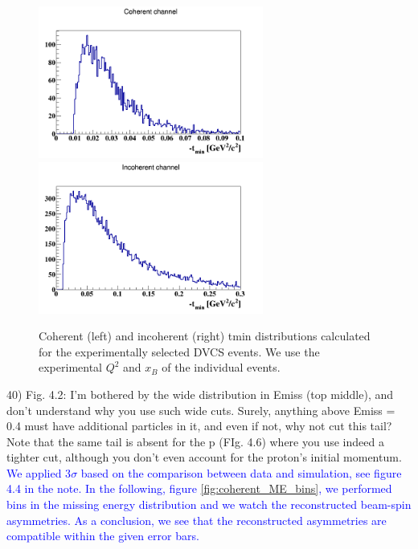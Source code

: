 \begin{figure}[tbp]
\includegraphics[height=5.0cm]{fig/tmin_coh.png}
\includegraphics[height=5.0cm]{fig/tmin_incoh.png}
\caption{Coherent (left) and incoherent (right) tmin distributions calculated 
for the experimentally selected DVCS events. We use the experimental $Q^{2}$ 
and $x_{B}$ of the individual events. }
\label{fig:tmin_both}
 \end{figure}


40) Fig. 4.2: I'm bothered by the wide distribution in Emiss (top middle), and 
don't understand why you use such wide cuts. Surely, anything above Emiss = 0.4 
must have additional particles in it, and even if not, why not cut this tail?  
Note that the same tail is absent for the p (FIg. 4.6) where you use indeed a 
tighter cut, although you don't even account for the proton's initial 
momentum.\\
\textcolor{blue}{ We applied 3$\sigma$ based on the comparison between data 
and simulation, see figure 4.4 in the note. In the following, figure 
\ref{fig:coherent_ME_bins}, we performed bins in the missing energy 
distribution and we watch the reconstructed beam-spin asymmetries. As a 
conclusion, we see that the reconstructed asymmetries are compatible within the 
given error bars.} \\

